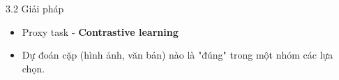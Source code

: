 \begin{frame}{3.2 Giải pháp}
\begin{itemize}
    \item Proxy task - \textbf{Contrastive learning}
    \item Dự đoán cặp (hình ảnh, văn bản) nào là "đúng" trong một nhóm các lựa chọn.
\end{itemize}
\end{frame}




        
